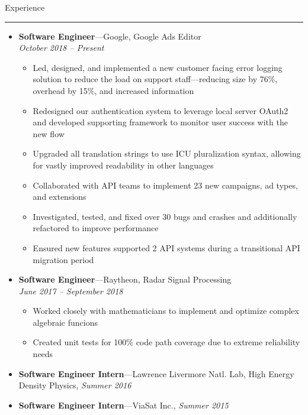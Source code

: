 \documentclass[10pt,oneside]{article}
\newcommand{\sectitle}[1]{
  \begin{flushleft}{\selectfont\Large#1}\end{flushleft}
}
\newenvironment{ressection}[1]{
  \vspace{2pt}
  \sectitle{#1}
  \vspace{-10pt}\rule{\textwidth}{0.5pt}
  \vspace{-10pt}
  \begin{itemize}[leftmargin=13pt]
  \vspace{3pt}
}{
  \end{itemize}
}
\newcommand{\ressubitem}[1]{
  \vspace{-1pt}
  \item \begin{flushleft} #1 \end{flushleft}
}
\newcommand{\resbigitemline}[3]{
  \vspace{-5pt}
  \item
  \textbf{#1}---#2, 
  \textit{#3}
}
\newcommand{\resbigitem}[3]{
  \vspace{-5pt}
  \item
  \textbf{#1}---#2 \\
  \textit{#3}
}
\newenvironment{ressubsec}[3]{
  \resbigitem{#1}{#2}{#3}
  \vspace{-4pt}
  \begin{itemize}[leftmargin=*]

}{
  \end{itemize}
}
\begin{document}
\begin{ressection}{Experience}
  \begin{ressubsec}{Software Engineer}{Google, Google Ads Editor}{October 2018 -- Present}
    \ressubitem{Led, designed, and implemented a new customer facing error logging solution to reduce the load on support staff---reducing size by 76\%, overhead by 15\%, and increased information}
    \ressubitem{Redesigned our authentication system to leverage local server OAuth2 and developed supporting framework to monitor user success with the new flow}
    \ressubitem{Upgraded all translation strings to use ICU pluralization syntax, allowing for vastly improved readability in other languages}
    \ressubitem{Collaborated with API teams to implement 23 new campaigns, ad types, and extensions}
    \ressubitem{Investigated, tested, and fixed over 30 bugs and crashes and additionally refactored to improve performance}
    \ressubitem{Ensured new features supported 2 API systems during a transitional API migration period}
  \end{ressubsec}
  \begin{ressubsec}{Software Engineer}{Raytheon, Radar Signal Processing}{June 2017 -- September 2018}
    \ressubitem{Worked closely with mathematicians to implement and optimize complex algebraic funcions}
    \ressubitem{Created unit tests for 100\% code path coverage due to extreme reliability needs}
  \end{ressubsec}

  \resbigitemline{Software Engineer Intern}{Lawrence Livermore Natl. Lab, High Energy Density Physics}{Summer 2016}

  \resbigitemline{Software Engineer Intern}{ViaSat Inc.}{Summer 2015}

\end{ressection}
\end{document}
